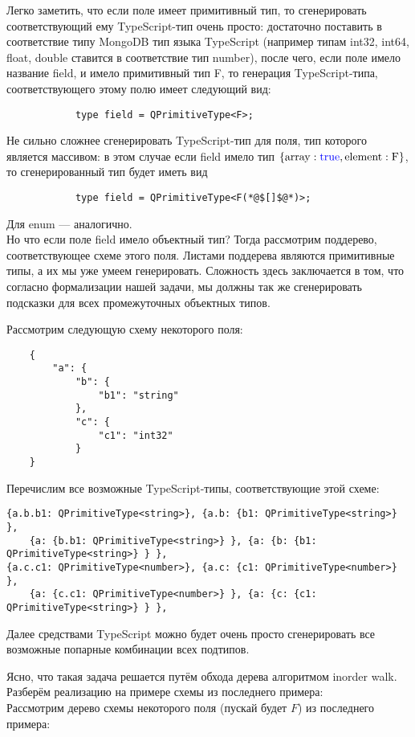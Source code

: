 \documentclass[12pt]{article}
\begin{document}
    Легко заметить, что если поле имеет примитивный тип, то сгенерировать соответствующий ему TypeScript-тип очень просто:
    достаточно поставить в соответствие типу MongoDB тип языка TypeScript (например типам int32, int64, float, double ставится в соответствие
    тип number), после чего, если поле имело название field, и имело примитивный тип F, то генерация TypeScript-типа, соответствующего этому
    полю имеет следующий вид:
    \begin{lstlisting}
            type field = QPrimitiveType<F>;
    \end{lstlisting}
    Не сильно сложнее сгенерировать TypeScript-тип для поля, тип которого является массивом: в этом случае если field имело тип
    $\{\mathrm{array}: \textcolor{blue}{\mathrm{true}}, \mathrm{element}: \mathrm{F}\}$, то сгенерированный тип будет иметь вид
    \begin{lstlisting}
            type field = QPrimitiveType<F(*@$[]$@*)>;
    \end{lstlisting}
    Для enum --- аналогично.\\
    Но что если поле field имело объектный тип? Тогда рассмотрим поддерево, соответствующее схеме этого поля. Листами поддерева являются примитивные
    типы, а их мы уже умеем генерировать. Сложность здесь заключается в том, что согласно формализации нашей задачи, мы должны
    так же сгенерировать подсказки для всех промежуточных объектных типов.
    \newpage
    \begin{example}
        Рассмотрим следующую схему некоторого поля:
        \begin{lstlisting}
    {
        "a": {
            "b": {
                "b1": "string"
            },
            "c": {
                "c1": "int32"
            }
    }
        \end{lstlisting}
        Перечислим все возможные TypeScript-типы, соответствующие этой схеме:
        \begin{lstlisting}
{a.b.b1: QPrimitiveType<string>}, {a.b: {b1: QPrimitiveType<string>} },
    {a: {b.b1: QPrimitiveType<string>} }, {a: {b: {b1: QPrimitiveType<string>} } },
{a.c.c1: QPrimitiveType<number>}, {a.c: {c1: QPrimitiveType<number>} },
    {a: {c.c1: QPrimitiveType<number>} }, {a: {c: {c1: QPrimitiveType<string>} } },
        \end{lstlisting}
        Далее средствами TypeScript можно будет очень просто сгенерировать все возможные попарные комбинации всех подтипов.
    \end{example}
    Ясно, что такая задача решается путём обхода дерева алгоритмом inorder walk\cite{inorderWalk}. Разберём реализацию на примере схемы из последнего
    примера:\\
    Рассмотрим дерево схемы некоторого поля (пускай будет $F$) из последнего примера:
\end{document}
